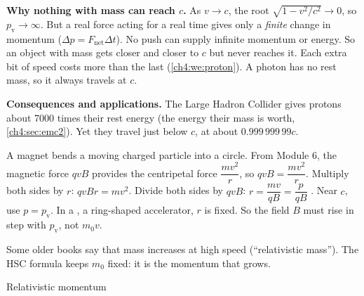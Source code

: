 \textbf{Why nothing with mass can reach $c$.} As $v \to c$, the root
$\sqrt{1 - v^2/c^2} \to 0$, so $p_\mathrm{v} \to \infty$. But a real force acting for a real time
gives only a \emph{finite} change in momentum ($\Delta p = F_\mathrm{net}\Delta t$). No push can
supply infinite momentum or energy. So an object with mass gets closer and closer to $c$ but
never reaches it. Each extra bit of speed costs more than the last (\cref{ch4:we:proton}).
A photon has no rest mass, so it always travels at $c$.

\textbf{Consequences and applications.} The Large Hadron Collider gives protons about 7000 times
their rest energy (the energy their mass is worth, \cref{ch4:sec:emc2}). Yet they travel just
below $c$, at about $0.999\,999\,99c$.

A magnet bends a moving charged particle into a circle. From Module 6, the magnetic force $qvB$
provides the centripetal force $\dfrac{mv^2}{r}$, so $qvB = \dfrac{mv^2}{r}$. Multiply both
sides by $r$: $qvBr = mv^2$. Divide both sides by $qvB$:
$r = \dfrac{mv}{qB} = \dfrac{p}{qB}$ \hscbadgenotonsheet. Near $c$, use $p = p_\mathrm{v}$. In a , a ring-shaped accelerator, $r$ is fixed. So the
field $B$ must rise in step with $p_\mathrm{v}$, not $m_0v$.

Some older books say that mass increases at high speed (``relativistic mass''). The HSC formula
keeps $m_0$ fixed: it is the momentum that grows.

\begin{formulacard}{Relativistic momentum}
  \begin{symbols}
  \end{symbols}
\end{formulacard}


